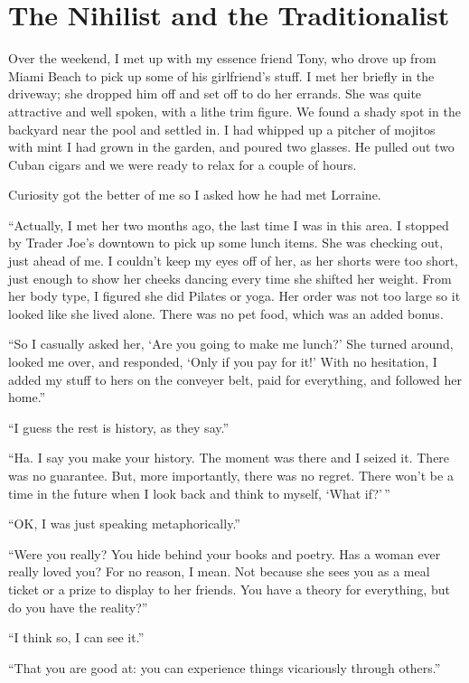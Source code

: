 \section{The Nihilist and the Traditionalist}

Over the weekend, I met up with my essence friend Tony, who drove up from Miami Beach to pick up some of his girlfriend's stuff. I met her briefly in the driveway; she dropped him off and set off to do her errands. She was quite attractive and well spoken, with a lithe trim figure. We found a shady spot in the backyard near the pool and settled in. I had whipped up a pitcher of mojitos with mint I had grown in the garden, and poured two glasses. He pulled out two Cuban cigars and we were ready to relax for a couple of hours.

Curiosity got the better of me so I asked how he had met Lorraine.

``Actually, I met her two months ago, the last time I was in this area. I stopped by Trader Joe's downtown to pick up some lunch items. She was checking out, just ahead of me. I couldn't keep my eyes off of her, as her shorts were too short, just enough to show her cheeks dancing every time she shifted her weight. From her body type, I figured she did Pilates or yoga. Her order was not too large so it looked like she lived alone. There was no pet food, which was an added bonus.

``So I casually asked her, `Are you going to make me lunch?' She turned around, looked me over, and responded, `Only if you pay for it!' With no hesitation, I added my stuff to hers on the conveyer belt, paid for everything, and followed her home.''

``I guess the rest is history, as they say.''

``Ha. I say you make your history. The moment was there and I seized it. There was no guarantee. But, more importantly, there was no regret. There won't be a time in the future when I look back and think to myself, `What if?'\,''

``OK, I was just speaking metaphorically.''

``Were you really? You hide behind your books and poetry. Has a woman ever really loved you? For no reason, I mean. Not because she sees you as a meal ticket or a prize to display to her friends. You have a theory for everything, but do you have the reality?''

``I think so, I can see it.''

``That you are good at: you can experience things vicariously through others.''

